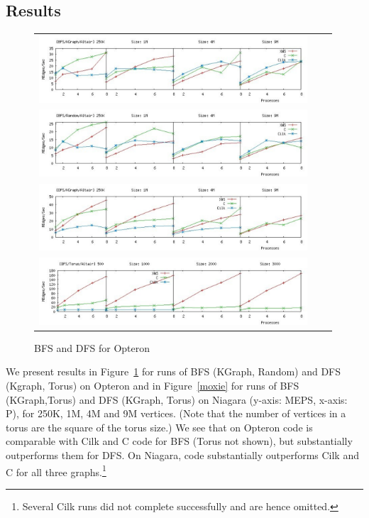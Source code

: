 \subsection{Results}
\begin{figure}
 \begin{tabular}{ccc}
\includegraphics[width=10cm]{plots/bfs-kgraph-altair-color.pdf} \\
\includegraphics[width=10cm] {plots/bfs-random-altair-color.pdf} \\
\includegraphics[width=10cm]{plots/dfs-kgraph-altair-color.pdf}\\
\includegraphics[width=10cm]{plots/dfs-torus-altair-color.pdf}\\
\end{tabular}
\caption{BFS and DFS for Opteron}\label{altair}
\end{figure}

We present results in Figure~\ref{altair} for runs of BFS (KGraph,
Random) and DFS (Kgraph, Torus) on Opteron and in Figure~\ref{moxie}
for runs of BFS (KGraph,Torus) and DFS (KGraph, Torus) on Niagara
(y-axis: MEPS, x-axis: P), for 250K, 1M, 4M and 9M vertices.  (Note
that the number of vertices in a torus are the square of the torus
size.) We see that on Opteron \XWS{} code is comparable with Cilk and
C code for BFS (Torus not shown), but substantially outperforms them
for DFS. On Niagara, \XWS{} code substantially outperforms Cilk and C
for all three graphs.\footnote{Several Cilk runs did not complete
successfully and are hence omitted.}

